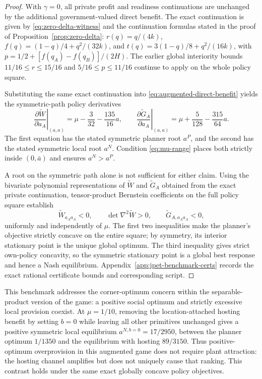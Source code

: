 \begin{proof}
With $\gamma=0$, all private profit and readiness continuations are
unchanged by the additional government-valued direct benefit.
The exact continuation is given by \eqref{eq:zero-delta-witness}
and the continuation formulas stated in the proof of Proposition~\ref{prop:zero-delta}: $r(q)=q/(4k)$,
$f(q)=(1-q)/4+q^2/(32k)$, and
$t(q)=3(1-q)/8+q^2/(16k)$, with
$p=1/2+[f(q_A)-f(q_B)]/(2H)$.
The earlier global interiority bounds
$11/16\le r\le15/16$ and $5/16\le p\le11/16$
continue to apply on the whole policy square.

Substituting the same exact continuation into
\eqref{eq:augmented-direct-benefit} yields the symmetric-path
policy derivatives
\begin{equation}
\left.\frac{\partial\widetilde W}{\partial a_A}\right|_{(a,a)}
=\mu-\frac{3}{32}-\frac{135}{16}a,
\qquad
\left.\frac{\partial\widetilde G_A}{\partial a_A}\right|_{(a,a)}
=\mu+\frac{5}{128}-\frac{315}{64}a.
\label{eq:augmented-origin-policies}
\end{equation}
The first equation has the stated symmetric planner root $a^P$,
and the second has the stated symmetric local root $a^N$.
Condition \eqref{eq:mu-range} places both strictly inside
$(0,\bar a)$ and ensures $a^N>a^P$.

A root on the symmetric path alone is not sufficient for either claim.
Using the bivariate polynomial representations of $\widetilde W$
and $\widetilde G_A$ obtained from the exact private continuation,
tensor-product Bernstein coefficients on the full policy square establish
\[
\widetilde W_{a_Aa_A}<0,\qquad
\det\nabla^2\widetilde W>0,\qquad
\widetilde G_{A,a_Aa_A}<0,
\]
uniformly and independently of $\mu$. The first two inequalities make
the planner's objective strictly concave on the entire square; by
symmetry, its interior stationary point is the unique global optimum.
The third inequality gives strict own-policy concavity, so the
symmetric stationary point is a global best response and hence a
Nash equilibrium. Appendix~\ref{app:jpet-benchmark-certs} records
the exact rational certificate bounds and corresponding script.
\end{proof}

This benchmark addresses the corner-optimum concern within the
separable-product version of the game: a positive social optimum and
strictly excessive local provision coexist. At $\mu=1/10$, removing
the location-attached hosting benefit by setting $b=0$ while leaving
all other primitives unchanged gives a positive symmetric local equilibrium
$a^{N,b=0}=17/2950$, between the planner optimum $1/1350$ and
the equilibrium with hosting $89/3150$. Thus positive-optimum
overprovision in this augmented game does not require plant attraction:
the hosting channel amplifies but does not uniquely cause that ranking.
This contrast holds under the same exact globally concave policy objectives.

